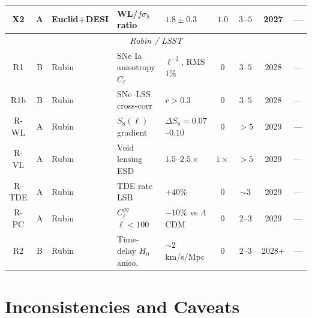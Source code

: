 \documentclass[11pt,a4paper]{article}
\newcommand{\LCDM}{$\Lambda$CDM}
\begin{document}
\begin{longtable}{@{}cclp{2.5cm}p{2.5cm}cccc@{}}
X2 & A & Euclid+DESI & WL/$f\sigma_8$ ratio & $1.8 \pm 0.3$
  & $1.0$ & $3$--$5$ & 2027 & --- \\

\midrule
\multicolumn{9}{c}{\textit{Rubin / LSST}} \\
\midrule

R1 & B & Rubin & SNe Ia anisotropy $C_\ell$ & $\ell^{-2}$, RMS $1\%$
  & 0 & $3$--$5$ & 2028 & --- \\

R1b & B & Rubin & SNe--LSS cross-corr & $r > 0.3$
  & 0 & $3$--$5$ & 2028 & --- \\

R-WL & A & Rubin & $S_8(\ell)$ gradient & $\Delta S_8 = 0.07$--$0.10$
  & 0 & $> 5$ & 2029 & --- \\

R-VL & A & Rubin & Void lensing ESD & $1.5$--$2.5\times$
  & $1\times$ & $> 5$ & 2029 & --- \\

R-TDE & A & Rubin & TDE rate LSB & $+40\%$ & 0
  & $\sim 3$ & 2029 & --- \\

R-PC & A & Rubin & $C_\ell^{gg}$ $\ell < 100$ & $-10\%$ vs \LCDM
  & 0 & $2$--$3$ & 2029 & --- \\

R2 & B & Rubin & Time-delay $H_0$ aniso. & $\sim 2$ km/s/Mpc
  & 0 & $2$--$3$ & 2028+ & --- \\

\end{longtable}
\normalsize


\section{Inconsistencies and Caveats}
\label{sec:caveats}
\end{document}
